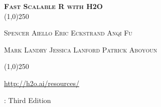 


%






\usepackage{syntonly}


\usepackage{jurabib}




\thispagestyle{empty} %

\begin{center}
\textsc{\Large\bf{Fast Scalable R with H2O}}
\\
\bigskip
\line(1,0){250}  %

\textsc{\small {Spencer Aiello \hspace{10pt} Eric Eckstrand \hspace{10pt} Anqi Fu}}

\textsc{\small {Mark Landry  \hspace{10pt}  Jessica Lanford \hspace{10pt}  Patrick Aboyoun}}

\line(1,0){250}  %

{\url{http://h2o.ai/resources/}}

\bigskip
\monthname \hspace{1pt}  \the\year: Third Edition 

\bigskip
\end{center}


\newpage
\restoregeometry

\null\vfill %
\thispagestyle{empty} %


